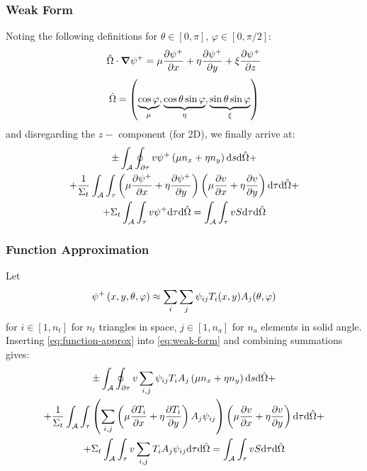 \begin{frame}
  \frametitle{Weak Form}
  Noting the following definitions for $\theta\in[0,\pi]$, $\varphi\in[0,\pi/2]$:
  \begin{equation}
    \hat{\Omega}\cdot\grad{\psi^+}=\mu\pdv{\psi^+}{x}+\eta\pdv{\psi^+}{y}+\xi\pdv{\psi^+}{z}
  \end{equation}
  \begin{equation}
    \hat{\Omega}=\left(\underbrace{\cos\varphi}_\mu,\underbrace{\cos\theta\sin\varphi}_\eta,\underbrace{\sin\theta\sin\varphi}_\xi\right)
  \end{equation}
  and disregarding the $z-$ component (for 2D), we finally arrive at:
  \begin{multline}\label{eq:weak-form}
    \pm\int_{\mathcal{A}}\oint_{\partial\tau}v\psi^+\left(\mu n_x+\eta n_y\right)\dd s\dd\hat{\Omega} +\\+\frac{1}{\Sigma_t}
    \int_{\mathcal{A}}\int_{\tau}\left(\mu\pdv{\psi^+}{x}+\eta\pdv{\psi^+}{y}\right)\left(\mu\pdv{v}{x}+\eta\pdv{v}{y}\right)\dd \tau \dd \hat{\Omega}+\\
    +\Sigma_t\int_{\mathcal{A}}\int_{\tau} v \psi^+\dd \tau \dd \hat{\Omega}=\int_{\mathcal{A}}\int_{\tau} vS\dd \tau \dd \hat{\Omega}
  \end{multline}
\end{frame}

\begin{frame}
  \frametitle{Function Approximation}
  Let
  \begin{equation}
    \label{eq:function-approx}
    \psi^+ \left(x,y,\theta,\varphi\right)\approx\sum_i\sum_j \psi_{ij}T_i(x,y)A_j(\theta,\varphi)
  \end{equation}
  for $i\in[1,n_t]$ for $n_t$ triangles in space, $j\in[1,n_a]$ for $n_a$ elements in solid angle.
  Inserting \cref{eq:function-approx} into \cref{eq:weak-form} and combining summations gives:
  \begin{multline}\label{eq:function-exp-fem}
    \pm\int_{\mathcal{A}}\oint_{\partial\tau}v\sum_{i,j} \psi_{ij}T_iA_j\left(\mu n_x+\eta n_y\right)\dd s\dd\hat{\Omega} +\\+
    \frac{1}{\Sigma_t}\int_{\mathcal{A}}\int_{\tau} \left(\sum_{i,j}\left(\mu\pdv{T_i}{x}+\eta\pdv{T_i}{y}\right)A_j\psi_{ij}\right)\left(\mu\pdv{v}{x}+\eta\pdv{v}{y}\right)\dd \tau \dd \hat{\Omega}+\\+
    \Sigma_t\int_{\mathcal{A}}\int_{\tau} v\sum_{i,j} T_i A_j \psi_{ij}\dd \tau \dd \hat{\Omega} = \int_{\mathcal{A}}\int_{\tau} vS\dd \tau \dd \hat{\Omega}
  \end{multline}
\end{frame}

